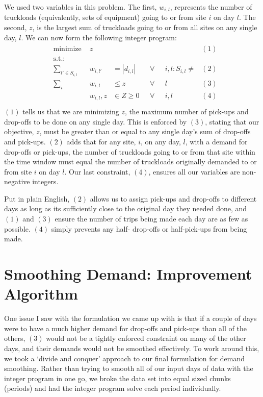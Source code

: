 \documentclass[letterpaper,10pt,english]{sphinxmanual}
\begin{document}
We used two variables in this problem. The first,
\(w_{i,l}\), represents the number of truckloads (equivalently, sets of
equipment) going to or from site \(i\) on day \(l\). The second,
\(z\), is the largest sum of truckloads going to or from all sites on any
single day, \(l\). We can now form the following integer program:
\begin{align*}\!\begin{aligned}
&\text{minimize } &z & & & &(1)\\
&\text{s.t.:} & & & &\\
& \sum_{l' \in S_{i,l}} & w_{i,l'} & = |d_{i,l}| \text{ } & \forall
& \text{ } i,l : S_{i,l} \neq \text{{}} &(2)\\
& \sum_{i} & w_{i,l} & \leq z \text{ } & \forall & \text{ } l &(3)\\
& & w_{i,l}, z & \in Z \geq 0 \text{ } & \forall & \text{ } i,l & (4)\\
\end{aligned}\end{align*}
\((1)\) tells us that we are minimizing \(z\), the maximum number of
pick-ups and drop-offs to be done on any single day. This is enforced by
\((3)\), stating that our objective, \(z\), must be greater than or
equal to any single day's sum of drop-offs and pick-ups.
\((2)\) adds that for any site, \(i\), on any day, \(l\), with a
demand for drop-offs or pick-ups, the number of truckloads going to or from
that site within the time window must equal the number of truckloads
originally demanded to or from site \(i\) on day \(l\). Our last
constraint, \((4)\), ensures all our variables are non-negative integers.

Put in plain English, \((2)\) allows us to assign pick-ups and drop-offs
to different days as long as its sufficiently close to the original day they
needed done, and \((1)\) and \((3)\) ensure the number of trips being
made each day are as few as possible. \((4)\) simply prevents any half-
drop-offs or half-pick-ups from being made.


\section{Smoothing Demand: Improvement Algorithm}
\label{\detokenize{variation:smoothing-demand-improvement-algorithm}}
One issue I saw with the formulation we came up with is that if a couple of
days were to have a much higher demand for drop-offs and pick-ups than
all of the others, \((3)\) would not be a tightly enforced
constraint on many of the other days, and their demands would not be smoothed
effectively. To work around this, we took a `divide and conquer' approach to
our final formulation for demand smoothing. Rather than trying to smooth all of our
input days of data with the integer program in one go, we broke the data set
into equal sized chunks (periods) and had the integer program solve each
period individually.
\end{document}
